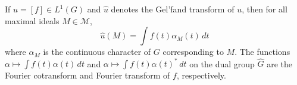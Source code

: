 \begin{proposition}
If $u = [f] \in L^1(G)$ and $\hat{u}$ denotes the Gel'fand transform of $u$, then for all maximal ideals $M \in \mathcal{M}$,
$$\hat{u}(M) = \int f(t) \alpha_M(t)\, dt$$
where $\alpha_M$ is the continuous character of $G$ corresponding to $M$. The functions $\alpha \mapsto \int f(t) \alpha(t)\, dt$ and $\alpha \mapsto \int f(t) \alpha(t)^*\, dt$ on the dual group $\hat{G}$ are the Fourier cotransform and Fourier transform of $f$, respectively.
\end{proposition}
